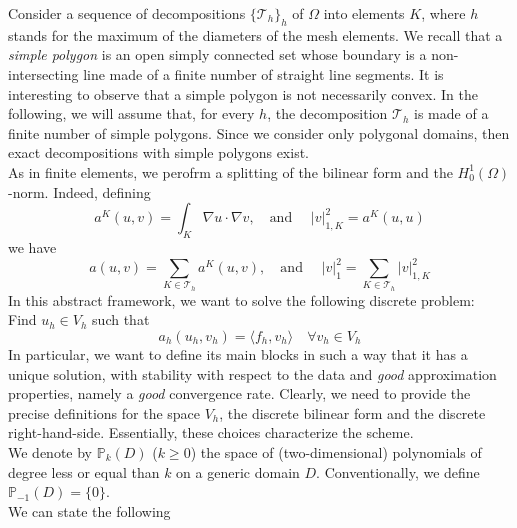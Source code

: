 \documentclass[10pt]{article}
\begin{document}
Consider a sequence of decompositions $\lbrace \mathcal{T}_h \rbrace_h$ of $\Omega$ into elements $K$, where $h$ stands for the maximum of the diameters of the mesh elements.
We recall that a \textit{simple polygon} is an open simply connected set whose boundary is a non-intersecting line made of a finite number of straight line segments. It is interesting to observe that a simple polygon is not necessarily convex. In the following, we will assume that, for every $h$, the decomposition $\mathcal{T}_h$ is made of a finite number of simple polygons. Since we consider only polygonal domains, then exact decompositions with simple polygons exist. \\
As in finite elements, we perofrm a splitting of the bilinear form and the $H_0^1(\Omega)$-norm. Indeed, defining
\begin{equation}
	a^K(u,v)=\int_{K} \nabla u \cdot \nabla v, \quad \text{and } \quad 
	|v|_{1,K}^2=a^K(u,u)
\end{equation}
we have 
\begin{equation}
a(u,v)=\sum_{K \in \mathcal{T}_h} a^K(u,v), \quad \text{and } \quad 
|v|_{1}^2=\sum_{K \in \mathcal{T}_h} |v|_{1,K}^2
\label{eqn:splitting}
\end{equation}
In this abstract framework, we want to solve the following discrete problem: \\
Find $u_h \in V_h$ such that
\begin{equation}
a_h(u_h,v_h) = \langle f_h,v_h \rangle \quad \forall v_h \in V_h
\label{eqn:discrete}
\end{equation}
In particular, we want to define its main blocks in such a way that it has a unique solution, with stability with respect to the data and \textit{good} approximation properties, namely a \textit{good} convergence rate. Clearly, we need to provide the precise definitions for the space $V_h$, the discrete bilinear form and the discrete right-hand-side. Essentially, these choices characterize the scheme. \\ 
We denote by $\mathbb{P}_k(D)$ ($k\geq0$) the space of (two-dimensional) polynomials of degree less or equal than $k$ on a generic domain $D$. Conventionally, we define $\mathbb{P}_{-1}(D)=\lbrace0\rbrace$. \\
We can state the following \\
\end{document}
